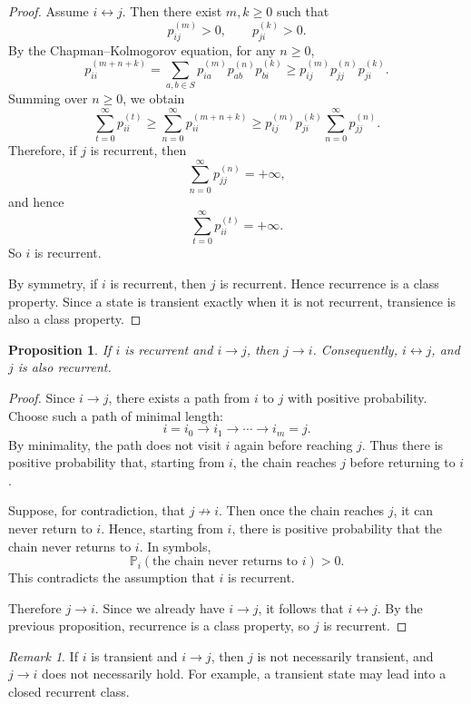 \documentclass[11pt]{article}
\theoremstyle{plain}
\newtheorem{proposition}[theorem]{Proposition}
\theoremstyle{definition}
\theoremstyle{remark}
\newtheorem{remark}[theorem]{Remark}
\begin{document}
\begin{proof}
	Assume \(i\leftrightarrow j\). Then there exist \(m,k\ge 0\) such that
	\[
	p_{ij}^{(m)}>0,
	\qquad
	p_{ji}^{(k)}>0.
	\]
	By the Chapman--Kolmogorov equation, for any \(n\ge 0\),
	\[
	p_{ii}^{(m+n+k)}
	=
	\sum_{a,b\in S}p_{ia}^{(m)}p_{ab}^{(n)}p_{bi}^{(k)}
	\ge
	p_{ij}^{(m)}p_{jj}^{(n)}p_{ji}^{(k)}.
	\]
	Summing over \(n\ge 0\), we obtain
	\[
	\sum_{t=0}^{\infty}p_{ii}^{(t)}
	\ge
	\sum_{n=0}^{\infty}p_{ii}^{(m+n+k)}
	\ge
	p_{ij}^{(m)}p_{ji}^{(k)}
	\sum_{n=0}^{\infty}p_{jj}^{(n)}.
	\]
	Therefore, if \(j\) is recurrent, then
	\[
	\sum_{n=0}^{\infty}p_{jj}^{(n)}=+\infty,
	\]
	and hence
	\[
	\sum_{t=0}^{\infty}p_{ii}^{(t)}=+\infty.
	\]
	So \(i\) is recurrent.
	
	By symmetry, if \(i\) is recurrent, then \(j\) is recurrent. Hence recurrence is a class property. Since a state is transient exactly when it is not recurrent, transience is also a class property.
\end{proof}



\begin{proposition}
	If \(i\) is recurrent and \(i\to j\), then \(j\to i\). Consequently, \(i\leftrightarrow j\), and \(j\) is also recurrent.
\end{proposition}

\begin{proof}
	Since \(i\to j\), there exists a path from \(i\) to \(j\) with positive probability. Choose such a path of minimal length:
	\[
	i=i_0\to i_1\to \cdots \to i_m=j.
	\]
	By minimality, the path does not visit \(i\) again before reaching \(j\). Thus there is positive probability that, starting from \(i\), the chain reaches \(j\) before returning to \(i\).
	
	Suppose, for contradiction, that \(j\not\to i\). Then once the chain reaches \(j\), it can never return to \(i\). Hence, starting from \(i\), there is positive probability that the chain never returns to \(i\). In symbols,
	\[
	\mathbb{P}_i(\text{the chain never returns to }i)>0.
	\]
	This contradicts the assumption that \(i\) is recurrent.
	
	Therefore \(j\to i\). Since we already have \(i\to j\), it follows that \(i\leftrightarrow j\). By the previous proposition, recurrence is a class property, so \(j\) is recurrent.
\end{proof}

\begin{remark}
	If \(i\) is transient and \(i\to j\), then \(j\) is not necessarily transient, and \(j\to i\) does not necessarily hold. For example, a transient state may lead into a closed recurrent class.
\end{remark}
\end{document}
